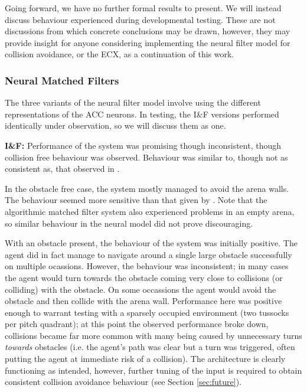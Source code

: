 \documentclass[a4paper,11pt,twoside,openright]{article}
\begin{document}
Going forward, we have no further formal results to present. We will
instead discuss behaviour experienced during developmental
testing. These are not discussions from which concrete conclusions may
be drawn, however, they may provide insight for anyone considering
implementing the neural filter model for collision avoidance, or the
ECX, as a continuation of this work.

\subsubsection{Neural Matched Filters}
The three variants of the neural filter model involve using the
different representations of the ACC neurons. In testing, the I\&F
versions performed identically under observation, so we will discuss
them as one.\newline\par

\textbf{I\&F:} Performance of the system was promising though
inconsistent, though collision free behaviour was observed. Behaviour
was similar to, though not as consistent as, that observed in
\cite{Mitchell2018}.
\newline\par

In the obstacle free case, the system mostly managed to avoid the
arena walls. The behaviour seemed more sensitive than
that given by \cite{Mitchell2018}. Note that the algorithmic matched
filter system also experienced problems in an empty arena, so similar
behaviour in the neural model did not prove discouraging.
\newline\par

With an obstacle present, the behaviour of the system was initially
positive. The agent did in fact manage to navigate around a single
large obstacle successfully on multiple ocassions. However, the
behaviour was inconsistent; in many cases the agent would turn
towards the obstacle coming very close to collisions (or colliding)
with the obstacle. On some occassions the agent would avoid the
obstacle and then collide with the arena wall. Performance here was
positive enough to warrant testing with a sparsely occupied
environment (two tussocks per pitch quadrant); at this point the
observed performance broke down, collisions became far more common
with many being caused by unnecessary turns \textit{towards} obstacles
(i.e. the agent's path was clear but a turn was triggered, often
putting the agent at immediate risk of a collision). The architecture
is clearly functioning as intended, however, further tuning of the
input is required to obtain consistent collision avoidance behaviour
(see Section \ref{sec:future}).
\newline\par
\end{document}
